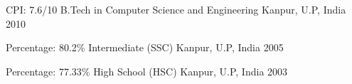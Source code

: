 



\begin{cvhonors}

  \cvhonor
    {CPI: 7.6/10} %
    {B.Tech in Computer Science and Engineering} %
    {Kanpur, U.P, India} %
    {2010} %

\end{cvhonors}




\begin{cvhonors}

  \cvhonor
    {Percentage: 80.2\%} %
    {Intermediate (SSC)} %
    {Kanpur, U.P, India} %
    {2005} %

  \cvhonor
    {Percentage: 77.33\%} %
    {High School (HSC)} %
    {Kanpur, U.P, India} %
    {2003} %

\end{cvhonors}

